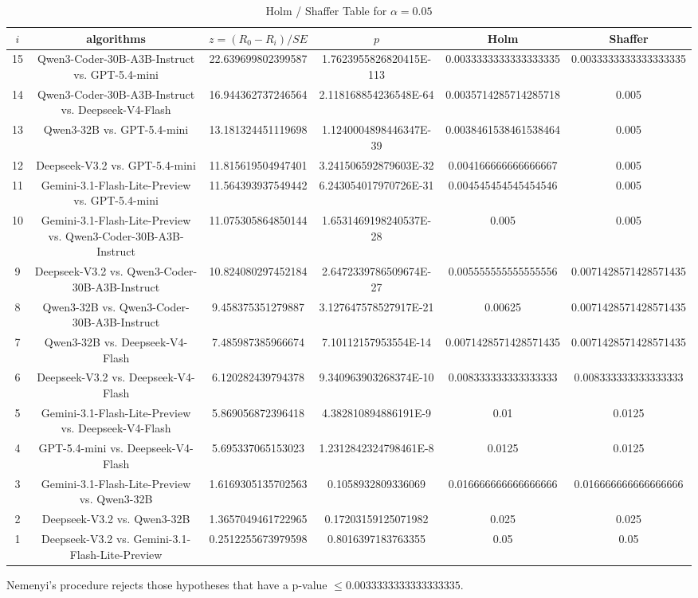 \documentclass[a4paper,10pt]{article}
\begin{document}
\begin{landscape}
\begin{table}[!htp]
\centering\tiny
\caption{Holm / Shaffer Table for $\alpha=0.05$}
\begin{tabular}{cccccc}
$i$&algorithms&$z=(R_0 - R_i)/SE$&$p$&Holm&Shaffer\\
\hline
15&Qwen3-Coder-30B-A3B-Instruct vs. GPT-5.4-mini&22.639699802399587&1.7623955826820415E-113&0.0033333333333333335&0.0033333333333333335\\14&Qwen3-Coder-30B-A3B-Instruct vs. Deepseek-V4-Flash&16.944362737246564&2.118168854236548E-64&0.0035714285714285718&0.005\\13&Qwen3-32B vs. GPT-5.4-mini&13.181324451119698&1.1240004898446347E-39&0.0038461538461538464&0.005\\12&Deepseek-V3.2 vs. GPT-5.4-mini&11.815619504947401&3.241506592879603E-32&0.004166666666666667&0.005\\11&Gemini-3.1-Flash-Lite-Preview vs. GPT-5.4-mini&11.564393937549442&6.243054017970726E-31&0.004545454545454546&0.005\\10&Gemini-3.1-Flash-Lite-Preview vs. Qwen3-Coder-30B-A3B-Instruct&11.075305864850144&1.6531469198240537E-28&0.005&0.005\\9&Deepseek-V3.2 vs. Qwen3-Coder-30B-A3B-Instruct&10.824080297452184&2.6472339786509674E-27&0.005555555555555556&0.0071428571428571435\\8&Qwen3-32B vs. Qwen3-Coder-30B-A3B-Instruct&9.458375351279887&3.127647578527917E-21&0.00625&0.0071428571428571435\\7&Qwen3-32B vs. Deepseek-V4-Flash&7.485987385966674&7.10112157953554E-14&0.0071428571428571435&0.0071428571428571435\\6&Deepseek-V3.2 vs. Deepseek-V4-Flash&6.120282439794378&9.340963903268374E-10&0.008333333333333333&0.008333333333333333\\5&Gemini-3.1-Flash-Lite-Preview vs. Deepseek-V4-Flash&5.869056872396418&4.382810894886191E-9&0.01&0.0125\\4&GPT-5.4-mini vs. Deepseek-V4-Flash&5.695337065153023&1.2312842324798461E-8&0.0125&0.0125\\3&Gemini-3.1-Flash-Lite-Preview vs. Qwen3-32B&1.6169305135702563&0.1058932809336069&0.016666666666666666&0.016666666666666666\\2&Deepseek-V3.2 vs. Qwen3-32B&1.3657049461722965&0.17203159125071982&0.025&0.025\\1&Deepseek-V3.2 vs. Gemini-3.1-Flash-Lite-Preview&0.2512255673979598&0.8016397183763355&0.05&0.05\\\hline
\end{tabular}
\end{table}
Nemenyi's procedure rejects those hypotheses that have a p-value $\le0.0033333333333333335$.



\end{landscape}
\end{document}
